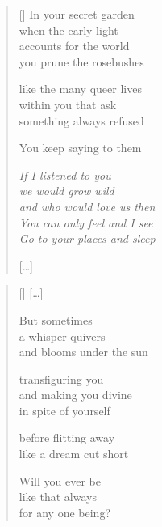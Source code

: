 \documentclass[14pt]{extbook}
\newcommand*{\centeredornament}{\centerline{\pgfornament[width=6cm]{88}}}
\begin{document}

\newpage

\vspace*{-15mm}
\centeredornament
\vspace*{-7mm}


\settowidth{\versewidth}{and who would love us then}

\begin{verse}[\versewidth]
  In your secret garden \\
  when the early light \\
  accounts for the world \\
  you prune the rosebushes

  like the many queer lives \\
  within you that ask \\
  something always refused

  You keep saying to them

  \emph{If I listened to you \\
  we would grow wild \\
  and who would love us then \\
  You can only feel and I see \\
  Go to your places and sleep}

  \hfill [\ldots]
\end{verse}

\newpage

\vspace*{-15mm}
\centeredornament
\vspace*{-7mm}

\poemtitle*{\phantom{XXI}}

\settowidth{\versewidth}{and blooms under the sun}

\begin{verse}[\versewidth]
  \textnormal{[\ldots]}

  But sometimes \\
  a whisper quivers \\
  and blooms under the sun

  transfiguring you \\
  and making you divine \\
  in spite of yourself

  before flitting away \\
  like a dream cut short

  Will you ever be \\
  like that always \\
  for any one being?
\end{verse}
\end{document}
